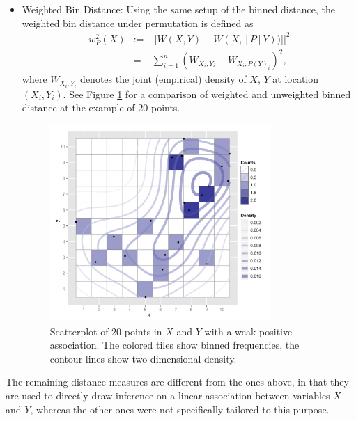 \documentclass[12]{report}
\begin{document}
\begin{itemize}
\item Weighted Bin Distance: Using the same setup of the binned distance, the weighted bin distance under permutation is defined as 
\begin{eqnarray*}
w_P^2(X) &:=&||W(X,Y) - W(X,[P]Y))||^2 \\ &=& \sum_{i=1}^n (W_{X_{i},Y_i} - W_{X_i,P(Y)_i})^2 , 
\end{eqnarray*}
where $W_{X_i,Y_i}$ denotes the joint (empirical) density of $X$, $Y$ at location $(X_i, Y_i)$. See Figure \ref{wbdist} for a comparison of weighted and unweighted binned distance at the example of 20  points.


\begin{figure}[hbt]
   \centering
       \includegraphics[width=3.3in]{wbdist.pdf}
	\vspace{-.2in}
       \caption{Scatterplot of 20 points in $X$ and $Y$ with a weak positive association. The colored tiles show binned frequencies, the contour lines show two-dimensional density.}
       \label{wbdist}
\end{figure}
\end{itemize}

The remaining distance measures are different from the ones above, in that they are used to directly draw inference on a linear association between variables $X$ and $Y$, whereas the other ones were not specifically tailored to this purpose.

\end{document}
